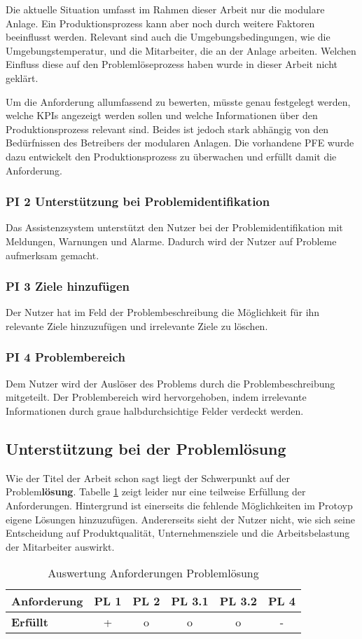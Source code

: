 Die aktuelle Situation umfasst im Rahmen dieser Arbeit nur die modulare Anlage. Ein Produktionsprozess kann aber noch durch weitere Faktoren beeinflusst werden. Relevant sind auch die Umgebungsbedingungen, wie die Umgebungstemperatur, und die Mitarbeiter, die an der Anlage arbeiten. Welchen Einfluss diese auf den Problemlöseprozess haben wurde in dieser Arbeit nicht geklärt.

Um die Anforderung allumfassend zu bewerten, müsste genau festgelegt werden, welche KPIs angezeigt werden sollen und welche Informationen über den Produktionsprozess relevant sind. Beides ist jedoch stark abhängig von den Bedürfnissen des Betreibers der modularen Anlagen. Die vorhandene PFE wurde dazu entwickelt den Produktionsprozess zu überwachen und erfüllt damit die Anforderung.

\subsubsection*{PI 2 Unterstützung bei Problemidentifikation}
Das Assistenzsystem unterstützt den Nutzer bei der Problemidentifikation mit Meldungen, Warnungen und Alarme. Dadurch wird der Nutzer auf Probleme aufmerksam gemacht.

\subsubsection*{PI 3 Ziele hinzufügen}
Der Nutzer hat im Feld der Problembeschreibung die Möglichkeit für ihn relevante Ziele hinzuzufügen und irrelevante Ziele zu löschen.

\subsubsection*{PI 4 Problembereich}
Dem Nutzer wird der Auslöser des Problems durch die Problembeschreibung mitgeteilt. Der Problembereich wird hervorgehoben, indem irrelevante Informationen durch graue halbdurchsichtige Felder verdeckt werden.

\subsection{Unterstützung bei der Problemlösung}
Wie der Titel der Arbeit schon sagt liegt der Schwerpunkt auf der Problem\textbf{lösung}. Tabelle \ref{tab:Anforderungen-Problemlösung} zeigt leider nur eine teilweise Erfüllung der Anforderungen. Hintergrund ist einerseits die fehlende Möglichkeiten im Protoyp eigene Lösungen hinzuzufügen. Andererseits sieht der Nutzer nicht, wie sich seine Entscheidung auf Produktqualität, Unternehmensziele und die Arbeitsbelastung der Mitarbeiter auswirkt.
\begin{table}[htbp]
\caption{Auswertung Anforderungen Problemlösung}
\centering
\begin{tabular}{l|c|c|c|c|c}
\textbf{Anforderung} & PL 1 & PL 2 & PL 3.1 & PL 3.2 & PL 4 \\
\hline
\textbf{Erfüllt} & + & o & o & o & - \\
\end{tabular}
\label{tab:Anforderungen-Problemlösung}
\end{table}

